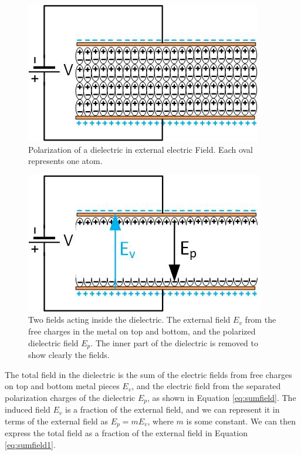 \documentclass{ximera}
\begin{document}
\begin{figure}[htbp]
\begin{center}
\includegraphics[scale=1]{../jpg/polarizationDielectric.jpg}
\end{center}
\caption{Polarization of a dielectric in external electric Field. Each oval represents one atom.}
\label{fig:Dielectric2}
\end{figure}


\begin{figure}[htbp]
\begin{center}
\includegraphics[scale=1]{../jpg/polarizationDielectric1.jpg}
\end{center}
\caption{Two fields acting inside the dielectric. The external field $E_v$ from the free charges in the metal on top and bottom, and the polarized dielectric field $E_p$. The inner part of the dielectric is removed to show clearly the fields.}
\label{fig:Dielectric3}
\end{figure}

The total field in the dielectric is the sum of the electric fields from free charges on top and bottom metal pieces $E_v$, and the electric field from the separated polarization charges of the dielectric $E_p$, as shown in Equation \ref{eq:sumfield}. The induced field $E_v$ is a fraction of the external field, and we can represent it in terms of the external field as $E_p=m E_v$, where $m$ is some constant. We can then express the total field as a fraction of the external field in Equation \ref{eq:sumfield1}.
\end{document}
